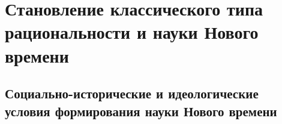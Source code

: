 



\section{Становление классического типа
рациональности и науки Нового времени} 

\subsection{Социально-исторические и идеологические
условия формирования науки Нового времени}









